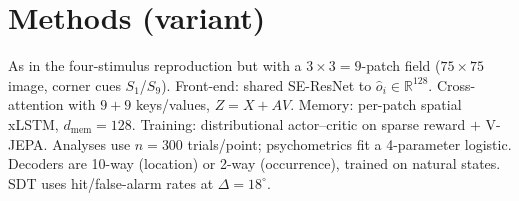 \documentclass[11pt]{article}
\begin{document}
\section{Methods (variant)}
As in the four-stimulus reproduction but with a $3\times3=9$-patch field ($75\times75$ image, corner
cues $S_1$/$S_9$). Front-end: shared SE-ResNet to $\hat o_i\in\mathbb R^{128}$. Cross-attention with
$9{+}9$ keys/values, $Z=X+AV$. Memory: per-patch spatial xLSTM, $d_{\mathrm{mem}}{=}128$. Training:
distributional actor--critic on sparse reward $+$ V-JEPA. Analyses use $n{=}300$ trials/point;
psychometrics fit a 4-parameter logistic. Decoders are 10-way (location) or 2-way (occurrence), trained
on natural states. SDT uses hit/false-alarm rates at $\Delta{=}18^\circ$.
\end{document}
